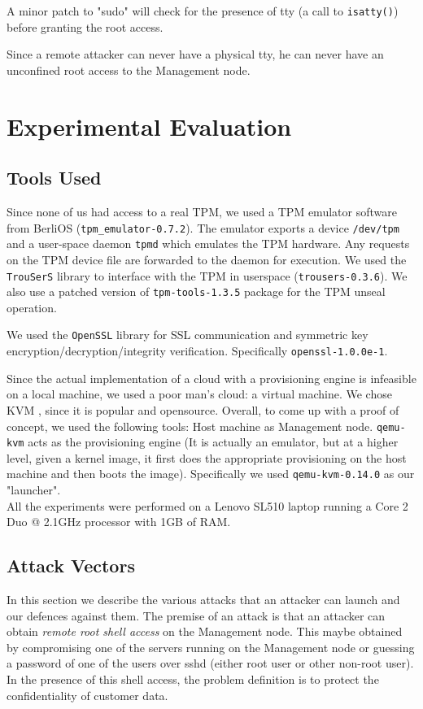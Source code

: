 \documentclass[10pt,twocolumn,pdftex]{article}
\begin{document}
A minor patch to "sudo" will check for the presence of tty (a call to {\tt isatty()}) before granting the root access. 

Since a remote attacker can never have a physical tty, he can never have an unconfined root access to the Management node.

\section{Experimental Evaluation}
\label{sec:evaluation}

\subsection{Tools Used}
Since none of us had access to a real TPM, we used a TPM emulator software from BerliOS ({\tt tpm\_emulator-0.7.2}). The emulator exports a device {\tt /dev/tpm} and a user-space daemon {\tt tpmd} which emulates the TPM hardware. Any requests on the TPM device file are forwarded to the daemon for execution. We used the {\tt TrouSerS} library to interface with the TPM in userspace ({\tt trousers-0.3.6}). We also use a patched version of {\tt tpm-tools-1.3.5} package for the TPM unseal operation.

We used the {\tt OpenSSL} library for SSL communication and symmetric key encryption/decryption/integrity verification. Specifically {\tt openssl-1.0.0e-1}. 

Since the actual implementation of a cloud with a provisioning engine is infeasible on a local machine, we used a poor man's cloud: a virtual machine. We chose KVM \cite{KVM}, since it is popular and opensource. Overall, to come up with a proof of concept, we used the following tools: Host machine as Management node. {\tt qemu-kvm} acts as the provisioning engine (It is actually an emulator, but at a higher level, given a kernel image, it first does the appropriate provisioning on the host machine and then boots the image). Specifically we used {\tt qemu-kvm-0.14.0} as our "launcher". \\

All the experiments were performed on a Lenovo SL510 laptop running a Core 2 Duo @ 2.1GHz processor with 1GB of RAM. 

\subsection{Attack Vectors}
In this section we describe the various attacks that an attacker can launch and our defences against them. The premise of an attack is that an attacker can obtain \emph{remote root shell access} on the Management node. This maybe obtained by compromising one of the servers running on the Management node or guessing a password of one of the users over sshd (either root user or other non-root user). In the presence of this shell access, the problem definition is to protect the confidentiality of customer data.
\end{document}
